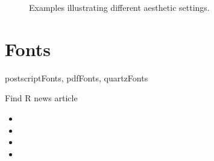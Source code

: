 \begin{figure}[htbp]
{  }
  \caption{Examples illustrating different aesthetic settings.}
\end{figure}

\section{Fonts}
\label{sec:fonts}

postscriptFonts, pdfFonts, quartzFonts

Find R news article

\begin{itemize}
  \item {}
  \item {}
  \item {}
  \item {}
\end{itemize}



